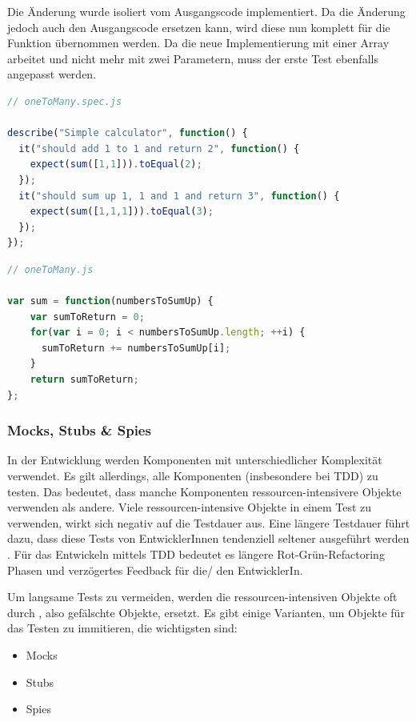 Die Änderung wurde isoliert vom Ausgangscode implementiert. Da die Änderung jedoch auch den Ausgangscode ersetzen kann, wird diese nun komplett für die Funktion  übernommen werden. Da die neue Implementierung mit einer Array arbeitet und nicht mehr mit zwei Parametern, muss der erste Test ebenfalls angepasst werden.

\begin{lstlisting}[language=JavaScript, caption=TDD - One to many - 3]
// oneToMany.spec.js

describe("Simple calculator", function() {
  it("should add 1 to 1 and return 2", function() {
    expect(sum([1,1])).toEqual(2);
  });
  it("should sum up 1, 1 and 1 and return 3", function() {
    expect(sum([1,1,1])).toEqual(3);
  });
});
\end{lstlisting}

\begin{lstlisting}[language=JavaScript, caption=TDD - One to many - Implementation]
// oneToMany.js

var sum = function(numbersToSumUp) {
    var sumToReturn = 0;
    for(var i = 0; i < numbersToSumUp.length; ++i) {
      sumToReturn += numbersToSumUp[i];
    }
    return sumToReturn;
};
\end{lstlisting}

\newpage
\subsubsection{Mocks, Stubs \& Spies}
In der Entwicklung werden Komponenten mit unterschiedlicher Komplexität verwendet. Es gilt allerdings, alle Komponenten (insbesondere bei TDD) zu testen. Das bedeutet, dass manche Komponenten ressourcen-intensivere Objekte verwenden als andere. Viele ressourcen-intensive Objekte in einem Test zu verwenden, wirkt sich negativ auf die Testdauer aus. Eine längere Testdauer führt dazu, dass diese Tests von EntwicklerInnen tendenziell seltener ausgeführt werden \autocite[4]{Johansen:2011}. Für das Entwickeln mittels TDD bedeutet es längere Rot-Grün-Refactoring Phasen und verzögertes Feedback für die/ den EntwicklerIn.

Um langsame Tests zu vermeiden, werden die ressourcen-intensiven Objekte oft durch , also gefälschte Objekte, ersetzt. Es gibt einige Varianten, um Objekte für das Testen zu immitieren, die wichtigsten sind:

\begin{itemize}
  \item Mocks
  \item Stubs
  \item Spies
\end{itemize}

